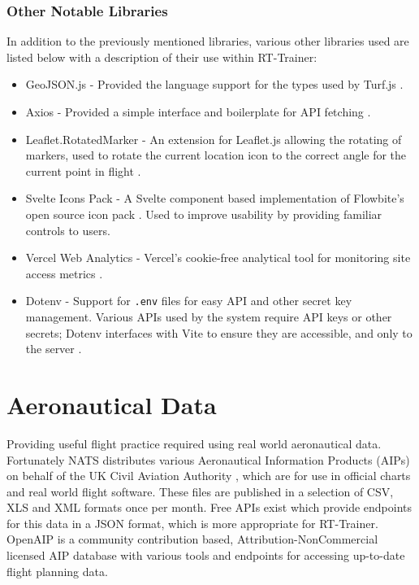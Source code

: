 \subsubsection{Other Notable Libraries}
\label{se:otherlibraries}
In addition to the previously mentioned libraries, various other libraries used are listed below with a description of their use within RT-Trainer:
\begin{itemize}
    \item GeoJSON.js - Provided the language support for the types used by Turf.js \cite{GeoJSONNPM}.
    \item Axios - Provided a simple interface and boilerplate for API fetching \cite{AxiosNPM}.
    \item Leaflet.RotatedMarker - An extension for Leaflet.js allowing the rotating of markers, used to rotate the current location icon to the correct angle for the current point in flight \cite{LeafletRotatedMarkerNPM}.
    \item Svelte Icons Pack - A Svelte component based implementation of Flowbite's open source icon pack \cite{FlowbiteIcons}\cite{FlowbiteSvelteIconsNPM}. Used to improve usability by providing familiar controls to users.
    \item Vercel Web Analytics - Vercel's cookie-free analytical tool for monitoring site access metrics \cite{VercelWebAnalyiticsNPM}.
    \item Dotenv - Support for \texttt{.env} files for easy API and other secret key management. Various APIs used by the system require API keys or other secrets; Dotenv interfaces with Vite to ensure they are accessible, and only to the server \cite{DotenvNPM}.
\end{itemize}

\section{Aeronautical Data}
\label{se:aerodata}

Providing useful flight practice required using real world aeronautical data. Fortunately NATS distributes various Aeronautical Information Products (AIPs) on behalf of the UK Civil Aviation Authority \cite{NATS-Datasets}, which are for use in official charts and real world flight software. These files are published in a selection of CSV, XLS and XML formats once per month. Free APIs exist which provide endpoints for this data in a JSON format, which is more appropriate for RT-Trainer. OpenAIP is a community contribution based, Attribution-NonCommercial licensed AIP database with various tools and endpoints for accessing up-to-date flight planning data.


